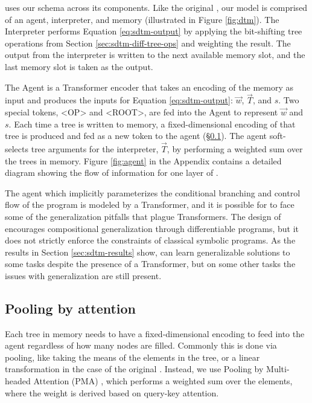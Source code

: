 \sdtm uses our \fullrepname schema across its components. Like the original \dtm, our model is comprised of an agent, interpreter, and memory (illustrated in Figure \ref{fig:dtm}). The Interpreter performs Equation \ref{eq:sdtm-output} by applying the bit-shifting tree operations from Section \ref{sec:sdtm-diff-tree-ops} and weighting the result. The output from the interpreter is written to the next available memory slot, and the last memory slot is taken as the output.

The Agent is a Transformer encoder that takes an encoding of the memory as input and produces the inputs for Equation \ref{eq:sdtm-output}: $\vec{w}$, $\vec{T}$, and $s$. Two special tokens, <OP> and <ROOT>, are fed into the Agent to represent $\vec{w}$ and $s$. Each time a tree is written to memory, a fixed-dimensional encoding of that tree is produced and fed as a new token to the agent (\S \ref{sec:sdtm-mha}). The agent soft-selects tree arguments for the interpreter, $\vec{T}$, by performing a weighted sum over the trees in memory. Figure \ref{fig:agent} in the Appendix contains a detailed diagram showing the flow of information for one layer of \sdtm.

The agent which implicitly parameterizes the conditional branching and control flow of the program is modeled by a Transformer, and it is possible for \sdtm to face some of the generalization pitfalls that plague Transformers. The design of \sdtm encourages compositional generalization through differentiable programs, but it does not strictly enforce the constraints of classical symbolic programs. As the results in Section \ref{sec:sdtm-results} show, \sdtm can learn generalizable solutions to some tasks despite the presence of a Transformer, but on some other tasks the issues with generalization are still present. 

\subsection{Pooling by attention} \label{sec:sdtm-mha}

Each tree in memory needs to have a fixed-dimensional encoding to feed into the agent regardless of how many nodes are filled. Commonly this is done via pooling, like taking the means of the elements in the tree, or a linear transformation in the case of the original \dtm. Instead, we use Pooling by Multi-headed Attention (PMA) \citep{lee_set_2019}, which performs a weighted sum over the elements, where the weight is derived based on query-key attention.

